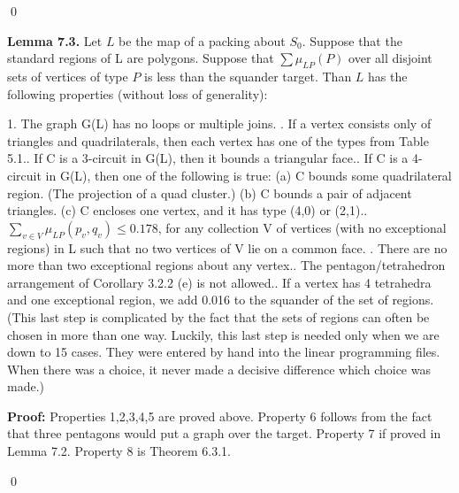 \qed
\enddemo



{\bf Lemma 7.3.} Let $L$ be the map of a packing about $S_0$.
Suppose that the standard regions of L are polygons.  
Suppose that $\sum \mu_{LP}(P)$ over all disjoint sets of vertices of type $P$ is less than the squander target.  
Than $L$ has the following properties (without loss of generality): 

1. The graph G(L) has no loops or multiple joins. . If a vertex consists only of triangles and quadrilaterals, then each vertex has one of the types from Table 5.1.. If C is a 3-circuit in G(L), then it bounds a triangular face.. If C is a 4-circuit in G(L), then one of the following is true:\newline
(a) C bounds some quadrilateral region. (The projection of a quad cluster.)\newline
(b) C bounds a pair of adjacent triangles.\newline
(c) C encloses one vertex, and it has type (4,0) or (2,1).. $\sum_{v\in V} \mu_{LP}(p_v,q_v) \leq 0.178$, for any collection V of vertices (with no exceptional regions) in L such that no two vertices of V lie on a common face. . There are no more than two exceptional regions about any vertex.. The pentagon/tetrahedron arrangement of Corollary 3.2.2 (e) is not allowed.. If a vertex has 4 tetrahedra and one exceptional region, we add 0.016 to the squander of the set of regions.(This last step is complicated by the fact that the sets of regions can often be chosen in more than one way.  Luckily, this last step is needed only when we are down to 15 cases.  They were entered by hand into the linear programming files.  When there was a choice, it never made a decisive difference which choice was made.) \newline

\bigskip

{\bf Proof:} Properties 1,2,3,4,5 are proved above.
Property 6 follows from the fact that three pentagons would put 
a graph over the target.
Property 7 if proved in Lemma 7.2.
Property 8 is Theorem 6.3.1.

\qed




